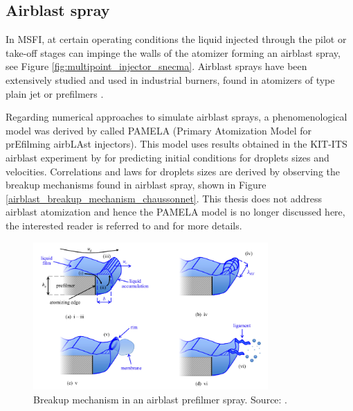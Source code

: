 \subsection{Airblast spray}

In MSFI, at certain operating conditions the liquid injected through the pilot or take-off stages can impinge the walls of the atomizer forming an airblast spray, see Figure \ref{fig:multipoint_injector_snecma}. Airblast sprays have been extensively studied  and used in industrial burners, found in atomizers of type plain jet or prefilmers .

Regarding numerical approaches to simulate airblast sprays, a phenomenological model was derived by  called PAMELA (Primary Atomization Model for prEfilming airbLAst injectors). This model uses results obtained in the KIT-ITS airblast experiment by  for predicting initial conditions for droplets sizes and velocities. Correlations and laws for droplets sizes are derived by observing the breakup mechanisms found in airblast spray, shown in Figure \ref{airblast_breakup_mechanism_chaussonnet}. This thesis does not address airblast atomization and hence the PAMELA model is no longer discussed here, the interested reader is referred to  and  for more details.

\begin{figure}[ht]
    \centering
    \includegraphics[width=0.8\textwidth]{./part1_numerical_approaches/figures_ch3/airblast_breakup_mechanism_chaussonnet}
       \centering
    \caption{Breakup mechanism in an airblast prefilmer spray. Source: .}
    \label{fig:airblast_breakup_mechanism_chaussonnet}
\end{figure}





